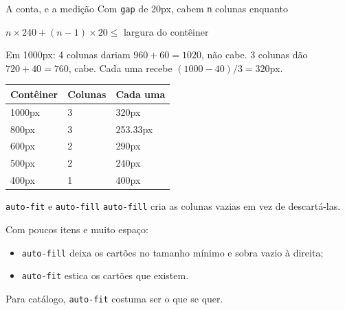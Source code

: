 \documentclass{beamer}
\begin{document}
\begin{frame}{A conta, e a medição}
	Com \texttt{gap} de 20px, cabem \texttt{n} colunas enquanto

	\begin{center}
		\large $n \times 240 + (n-1) \times 20 \leq$ largura do contêiner
	\end{center}

	\vspace{0.2cm}
	Em 1000px: 4 colunas dariam $960 + 60 = 1020$, não cabe. 3 colunas dão
	$720 + 40 = 760$, cabe. Cada uma recebe $(1000 - 40)/3 = 320$px.

	\vspace{0.3cm}
	\begin{center}
		\begin{tabular}{lll}
			\toprule
			\textbf{Contêiner} & \textbf{Colunas} & \textbf{Cada uma} \\
			\midrule
			1000px             & 3                & 320px             \\
			800px              & 3                & 253.33px          \\
			600px              & 2                & 290px             \\
			500px              & 2                & 240px             \\
			400px              & 1                & 400px             \\
			\bottomrule
		\end{tabular}
	\end{center}
\end{frame}

\begin{frame}{\texttt{auto-fit} e \texttt{auto-fill}}
	\texttt{auto-fill} cria as colunas vazias em vez de descartá-las.

	\vspace{0.4cm}
	Com poucos itens e muito espaço:

	\begin{itemize}
		\item \texttt{auto-fill} deixa os cartões no tamanho mínimo e sobra vazio à
		      direita;
		\item \texttt{auto-fit} estica os cartões que existem.
	\end{itemize}

	\vspace{0.4cm}
	Para catálogo, \texttt{auto-fit} costuma ser o que se quer.
\end{frame}
\end{document}
